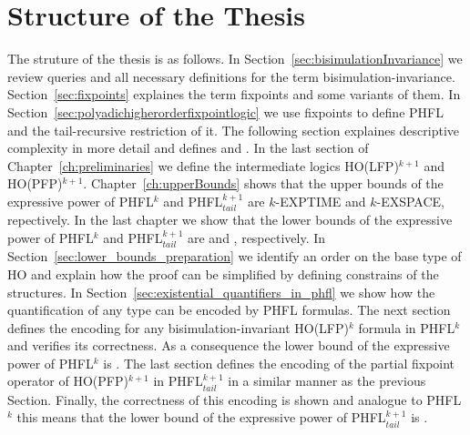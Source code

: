 \section*{Structure of the Thesis}
The struture of the thesis is as follows. In Section~\ref{sec:bisimulationInvariance} we review queries and all necessary definitions for the term bisimulation-invariance. Section~\ref{sec:fixpoints} explaines the term fixpoints and some variants of them. In Section~\ref{sec:polyadichigherorderfixpointlogic} we use fixpoints to define PHFL and the tail-recursive restriction of it. The following section explaines descriptive complexity in more detail and defines  and . In the last section of Chapter~\ref{ch:preliminaries} we define the intermediate logics HO(LFP)$^{k+1}$ and HO(PFP)$^{k+1}$. Chapter~\ref{ch:upperBounds} shows that the upper bounds of the expressive power of PHFL$^k$ and PHFL$^{k+1}_{tail}$ are $k$-EXPTIME and $k$-EXSPACE, repectively. In the last chapter we show that the lower bounds of the expressive power of PHFL$^k$ and PHFL$^{k+1}_{tail}$ are  and , respectively. In Section~\ref{sec:lower_bounds_preparation} we identify an order on the base type of HO and explain how the proof can be simplified by defining constrains of the structures. In Section~\ref{sec:existential_quantifiers_in_phfl} we show how the quantification of any type can be encoded by PHFL formulas. The next section defines the encoding for any bisimulation-invariant HO(LFP)$^k$ formula in PHFL$^k$ and verifies its correctness. As a consequence the lower bound of the expressive power of PHFL$^k$ is . The last section defines the encoding of the partial fixpoint operator of HO(PFP)$^{k+1}$ in PHFL$^{k+1}_{tail}$ in a similar manner as the previous Section. Finally, the correctness of this encoding is shown and analogue to PHFL$^k$ this means that the lower bound of the expressive power of PHFL$^{k+1}_{tail}$ is .
